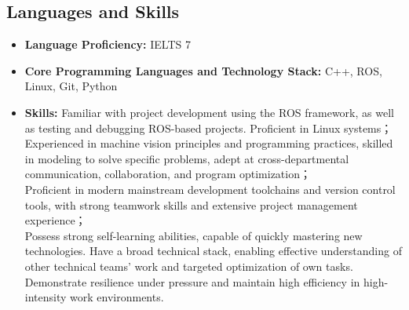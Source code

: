 \documentclass[letterpaper,11pt]{article}
\newcommand{\resumeItem}[2]{
  \item\small{
    \textbf{#1}{ #2 \vspace{-2pt}}
  }
}
\newcommand{\resumeSubItem}[2]{\resumeItem{#1}{#2}\vspace{-4pt}}
\newcommand{\resumeSubHeadingListStart}{\begin{itemize}[leftmargin=*]}
\newcommand{\resumeSubHeadingListEnd}{\end{itemize}}
\begin{document}
\begin{spacing}{1.3}
\section{Languages and Skills}
 \resumeSubHeadingListStart
 \resumeSubItem{Language Proficiency:}{IELTS 7}
 \resumeSubItem{Core Programming Languages and Technology Stack:}{C++, ROS, Linux, Git, Python \\}
 \begin{spacing}{0.3}
 \end{spacing}
 \resumeSubItem{Skills:}
    {Familiar with project development using the ROS framework, as well as testing and debugging ROS-based projects. Proficient in Linux systems； \\ 
     Experienced in machine vision principles and programming practices, skilled in modeling to solve specific problems, adept at cross-departmental communication, collaboration, and program optimization； \\ 
     Proficient in modern mainstream development toolchains and version control tools, with strong teamwork skills and extensive project management experience； \\ 
     Possess strong self-learning abilities, capable of quickly mastering new technologies. Have a broad technical stack, enabling effective understanding of other technical teams' work and targeted optimization of own tasks. Demonstrate resilience under pressure and maintain high efficiency in high-intensity work environments.}
 \resumeSubHeadingListEnd

\end{spacing}
\end{document}
